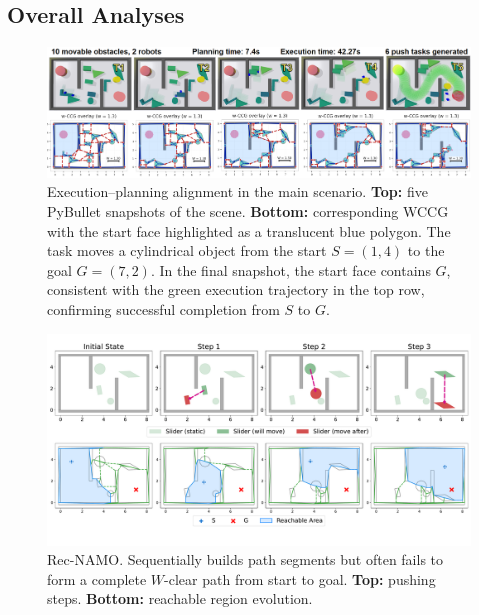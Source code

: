 \subsection{Overall Analyses}\label{subsec:overall}
\begin{figure}[t!]
  \centering
  \includegraphics[width=0.95\linewidth]{figures/sim_exp.png}
  \vspace{-2mm}
\caption{Execution--planning alignment in the main scenario. 
\textbf{Top:} five PyBullet snapshots of the scene. 
\textbf{Bottom:} corresponding WCCG with the start face highlighted as a translucent blue polygon.
The task moves a cylindrical object from the start \(S=(1,4)\) to the goal \(G=(7,2)\). 
In the final snapshot, the start face contains \(G\), 
consistent with the green execution trajectory in the top row, 
confirming successful completion from \(S\) to \(G\). 
}
 \vspace{-4mm}
\end{figure}
\begin{figure}
  \centering
  \vspace{-1mm}
  \includegraphics[width=0.95\columnwidth]{figures/Rec_NAMO.pdf}
  \vspace{-4mm}
  \caption{Rec-NAMO. Sequentially builds path segments but often fails to form a complete $W$-clear path from start to goal. \textbf{Top:} pushing steps. \textbf{Bottom:} reachable region evolution.}
  \vspace{-3mm}
  \label{fig:baseline}
\end{figure}

